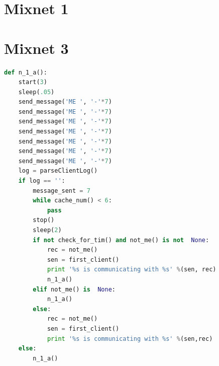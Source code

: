 \documentclass[preprint,12pt,3p]{elsarticle}
\begin{document}
\section{Mixnet 1}

\section{Mixnet 3}
\begin{lstlisting}[language=Python]
def n_1_a():
    start(3)
    sleep(.05)
    send_message('ME ', '-'*7)
    send_message('ME ', '-'*7)
    send_message('ME ', '-'*7)
    send_message('ME ', '-'*7)
    send_message('ME ', '-'*7)
    send_message('ME ', '-'*7)
    send_message('ME ', '-'*7)
    log = parseClientLog()
    if log == '':
        message_sent = 7
        while cache_num() < 6:
            pass
        stop()
        sleep(2)
        if not check_for_tim() and not_me() is not  None:
            rec = not_me()
            sen = first_client()
            print '%s is communicating with %s' %(sen, rec)
            n_1_a()
        elif not_me() is  None:
            n_1_a()
        else:
            rec = not_me()
            sen = first_client()
            print '%s is communicating with %s' %(sen,rec)
    else:
        n_1_a()
\end{lstlisting}

\label{appendix-sec1}


% 
% 
% 
% 
% 
% 
% 
% 
% 
% 
% 
% 

\end{document}
